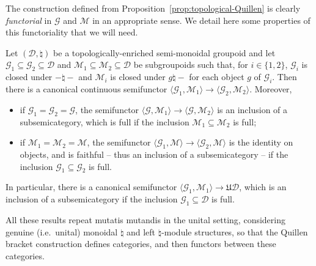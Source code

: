 \documentclass[AHL,Unicode,published]{cedram}
\newcommand{\fU}{\ensuremath{\mathfrak{U}}}
\newcommand{\cD}{\mathcal{D}}
\newcommand{\cG}{\mathcal{G}}
\newcommand{\cM}{\mathcal{M}}
\begin{document}
The construction defined from Proposition~\ref{prop:topological-Quillen} is clearly \emph{functorial} in $\cG$ and $\cM$ in an appropriate sense. We detail here some properties of this functoriality that we will need.

\begin{lemm}\label{lem:restriction}
Let $(\cD,\natural)$ be a topologically-enriched semi-monoidal groupoid and let $\cG_{1} \subseteq \cG_{2} \subseteq \cD$ and $\cM_{1} \subseteq \cM_{2} \subseteq \cD$ be subgroupoids such that, for $i \in \{1,2\}$, $\cG_{i}$ is closed under $- \natural -$ and $\cM_{i}$ is closed under $g \natural -$ for each object $g$ of $\cG_{i}$. Then there is a canonical continuous semifunctor $\langle \cG_{1}, \cM_{1} \rangle \to \langle \cG_{2}, \cM_{2} \rangle.$ Moreover,
\begin{itemize}
\item if $\cG_{1} = \cG_{2} = \cG$, the semifunctor $\langle \cG, \cM_{1} \rangle \to \langle \cG, \cM_{2} \rangle$ is an inclusion of a subsemicategory, which is full if the inclusion $\cM_{1} \subseteq \cM_{2}$ is full;
\item if $\cM_{1} = \cM_{2} = \cM$, the semifunctor $\langle \cG_{1}, \cM \rangle \to \langle \cG_{2}, \cM \rangle$ is the identity on objects, and is faithful -- thus an inclusion of a subsemicategory -- if the inclusion $\cG_{1} \subseteq \cG_{2}$ is full.
\end{itemize}
In particular, there is a canonical semifunctor $\langle \cG_{1}, \cM_{1} \rangle \to \fU\cD$, which is an inclusion of a subsemicategory if the inclusion $\cG_{1} \subseteq \cD$ is full.

All these results repeat mutatis mutandis in the unital setting, considering genuine (i.e.~unital) monoidal $\natural$ and left $\natural$-module structures, so that the Quillen bracket construction defines categories, and then functors between these categories.
\end{lemm}
\end{document}
